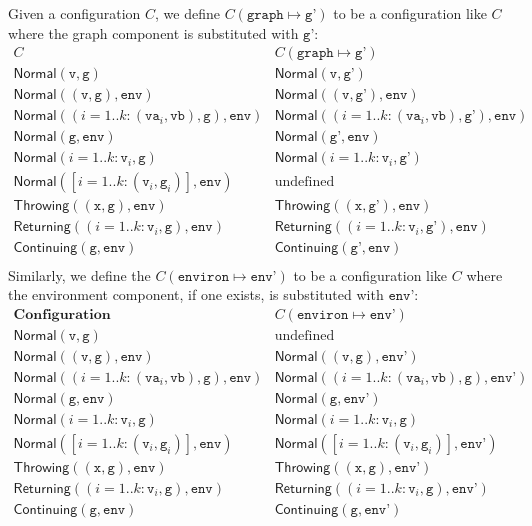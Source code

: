 \documentclass{book}
\newcommand\withgraph[2]{{#1}(\texttt{graph}\mapsto{#2})}
\newcommand\withenviron[2]{{#1}(\texttt{environ}\mapsto{#2})}
\newcommand\Normal[0]{\textsf{Normal}}
\newcommand\Throwing[0]{\textsf{Throwing}}
\newcommand\Continuing[0]{\textsf{Continuing}}
\newcommand\Returning[0]{\textsf{Returning}}
\newcommand\env[0]{\texttt{env}}
\newcommand\envp[0]{\texttt{env'}}
\newcommand\vg[0]{\texttt{g}}
\newcommand\vgp[0]{\texttt{g'}}
\newcommand\vv[0]{\texttt{v}}
\newcommand\vx[0]{\texttt{x}}
\begin{document}
Given a configuration $C$, we define $\withgraph{C}{\vgp}$ to be a configuration
like $C$ where the graph component is substituted with $\vgp$:
\[
\begin{array}{ll}
  C & \withgraph{C}{\vgp}\\
  \hline
  \Normal(\vv,\vg) & \Normal(\vv,\vgp)\\
  \Normal((\vv,\vg), \env) & \Normal((\vv,\vgp), \env)\\
  \Normal((i=1..k: (\texttt{va}_i,\texttt{vb}),\vg), \env) & \Normal((i=1..k: (\texttt{va}_i,\texttt{vb}),\vgp), \env)\\
  \Normal(\vg, \env) & \Normal(\vgp, \env)\\
  \Normal(i=1..k: \vv_i, \vg) & \Normal(i=1..k: \vv_i, \vgp)\\
  \Normal([i=1..k: (\vv_i,\vg_i)], \env) & \text{undefined}\\
  \Throwing((\vx,\vg), \env) & \Throwing((\vx,\vgp), \env)\\
  \Returning((i=1..k: \vv_i,\vg), \env) & \Returning((i=1..k: \vv_i,\vgp), \env)\\
  \Continuing(\vg, \env) & \Continuing(\vgp, \env)\\
\end{array}
\]
Similarly, we define the $\withenviron{C}{\envp}$ to be a configuration
like $C$ where the environment component, if one exists, is substituted with $\envp$:
\[
\begin{array}{ll}
  \textbf{Configuration} & \withenviron{C}{\envp}\\
  \hline
  \Normal(\vv,\vg) & \text{undefined}\\
  \Normal((\vv,\vg), \env) & \Normal((\vv,\vg), \envp)\\
  \Normal((i=1..k: (\texttt{va}_i,\texttt{vb}),\vg), \env) & \Normal((i=1..k: (\texttt{va}_i,\texttt{vb}),\vg), \envp)\\
  \Normal(\vg, \env) & \Normal(\vg, \envp)\\
  \Normal(i=1..k: \vv_i, \vg) & \Normal(i=1..k: \vv_i, \vg)\\
  \Normal([i=1..k: (\vv_i,\vg_i)], \env) & \Normal([i=1..k: (\vv_i,\vg_i)], \envp)\\
  \Throwing((\vx,\vg), \env) & \Throwing((\vx,\vg), \envp)\\
  \Returning((i=1..k: \vv_i,\vg), \env) & \Returning((i=1..k: \vv_i,\vg), \envp)\\
  \Continuing(\vg, \env) & \Continuing(\vg, \envp)\\
\end{array}
\]
\end{document}

